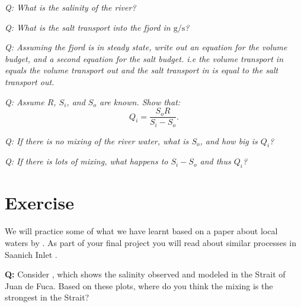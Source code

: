 \emph{Q: What is the salinity of the river?}

\emph{Q: What is the salt transport into the fjord in $\mathrm{g/s}$?}

\emph{Q: Assuming the fjord is in steady state, write out an equation
  for the volume budget, and a second equation for the salt
  budget. i.e the volume transport in equals the volume transport out and the
  salt transport in is equal to the salt transport out.}

\emph{Q: Assume $R$, $S_i$, and $S_o$ are known.  Show that:
\begin{equation}
  \label{eq:knudsen}
  Q_i = \frac{S_o R}{S_i-S_o}.
\end{equation}
}

\emph{Q: If there is no mixing of the river water, what is $S_o$, and how big is $Q_i$?}

\emph{Q: If there is lots of mixing, what happens to $S_i-S_o$ and
  thus $Q_i$?}


\clearpage
\section{Exercise}

We will practice some of what we have learnt based on a paper about
local waters by \citet{massoncummins04}. As part of your final project
you will read about similar processes in Saanich Inlet
\citep{gargettetal03}.

{\bf Q:}  Consider , which shows the
salinity observed and modeled in the Strait of Juan de Fuca.  Based on
these plots, where do you think the mixing is the strongest in the
Strait?

